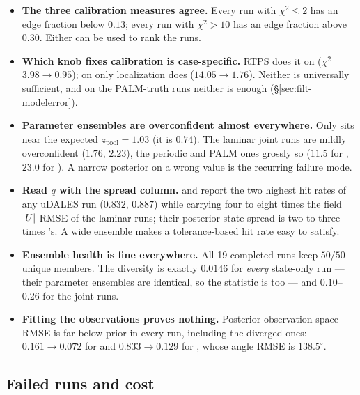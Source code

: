 \begin{itemize}[nosep]
  \item \textbf{The three calibration measures agree.} Every run with
        $\chi^2 \le 2$ has an edge fraction below $0.13$; every run with
        $\chi^2 > 10$ has an edge fraction above $0.30$. Either can be used to
        rank the runs.
  \item \textbf{Which knob fixes calibration is case-specific.} RTPS does it on
         ($\chi^2$ $3.98 \to 0.95$); on  only
        localization does ($14.05 \to 1.76$). Neither is universally
        sufficient, and on the PALM-truth runs neither is enough
        (\S\ref{sec:filt-modelerror}).
  \item \textbf{Parameter ensembles are overconfident almost everywhere.} Only
         sits near the expected $z_\mathrm{pool} = 1.03$ (it is
        $0.74$). The laminar joint runs are mildly overconfident ($1.76$,
        $2.23$), the periodic and PALM ones grossly so ($11.5$ for ,
        $23.0$ for ). A narrow posterior on a wrong value is the
        recurring failure mode.
  \item \textbf{Read $q$ with the spread column.}  and 
        report the two highest hit rates of any uDALES run ($0.832$, $0.887$)
        while carrying four to eight times the field $|U|$ RMSE of the
        laminar runs; their posterior state spread is two to three times
        's. A wide ensemble makes a tolerance-based hit rate easy to
        satisfy.
  \item \textbf{Ensemble health is fine everywhere.} All 19 completed runs keep
        $50/50$ unique members. The 
        diversity is exactly $0.0146$ for \emph{every} state-only run --- their
        parameter ensembles are identical, so the statistic is too --- and
        $0.10$--$0.26$ for the joint runs.
  \item \textbf{Fitting the observations proves nothing.} Posterior
        observation-space RMSE is far below prior in every run, including the
        diverged ones: $0.161 \to 0.072$ for  and $0.833 \to 0.129$
        for , whose angle RMSE is $138.5^\circ$.
\end{itemize}

\subsection{Failed runs and cost}
\label{sec:filt-failed}

